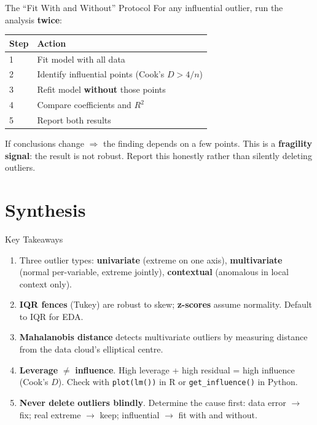 \documentclass[10pt]{beamer}
\begin{document}
\begin{frame}{The ``Fit With and Without'' Protocol}
  For any influential outlier, run the analysis \textbf{twice}:
  \centering
  \begin{tabular}{lp{5cm}}
    \toprule
    \textbf{Step} & \textbf{Action} \\
    \midrule
    1 & Fit model with all data \\
    2 & Identify influential points (Cook's $D > 4/n$) \\
    3 & Refit model \textbf{without} those points \\
    4 & Compare coefficients and $R^2$ \\
    5 & Report both results \\
    \bottomrule
  \end{tabular}
  \vspace{6pt}

  If conclusions change $\Rightarrow$ the finding depends on a few
  points. This is a \textbf{fragility signal}: the result is not
  robust. Report this honestly rather than silently deleting outliers.
\end{frame}

\section{Synthesis}

\begin{frame}{Key Takeaways}
  \begin{enumerate}
    \item Three outlier types: \textbf{univariate} (extreme on one axis),
          \textbf{multivariate} (normal per-variable, extreme jointly),
          \textbf{contextual} (anomalous in local context only).
    \item \textbf{IQR fences} (Tukey) are robust to skew; \textbf{z-scores}
          assume normality. Default to IQR for EDA.
    \item \textbf{Mahalanobis distance} detects multivariate outliers by
          measuring distance from the data cloud's elliptical centre.
    \item \textbf{Leverage} $\neq$ \textbf{influence}. High leverage +
          high residual = high influence (Cook's $D$). Check with
          \texttt{plot(lm())} in R or \texttt{get\_influence()} in Python.
    \item \textbf{Never delete outliers blindly}. Determine the cause
          first: data error $\rightarrow$ fix; real extreme $\rightarrow$
          keep; influential $\rightarrow$ fit with and without.
  \end{enumerate}
\end{frame}
\end{document}
